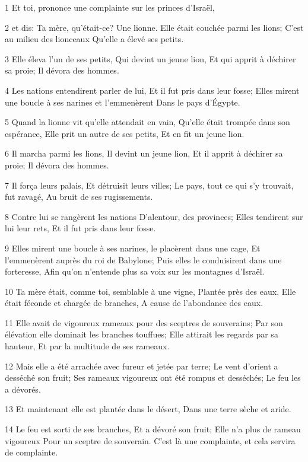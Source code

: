 \par 1 Et toi, prononce une complainte sur les princes d'Israël,
\par 2 et dis: Ta mère, qu'était-ce? Une lionne. Elle était couchée parmi les lions; C'est au milieu des lionceaux Qu'elle a élevé ses petits.
\par 3 Elle éleva l'un de ses petits, Qui devint un jeune lion, Et qui apprit à déchirer sa proie; Il dévora des hommes.
\par 4 Les nations entendirent parler de lui, Et il fut pris dans leur fosse; Elles mirent une boucle à ses narines et l'emmenèrent Dans le pays d'Égypte.
\par 5 Quand la lionne vit qu'elle attendait en vain, Qu'elle était trompée dans son espérance, Elle prit un autre de ses petits, Et en fit un jeune lion.
\par 6 Il marcha parmi les lions, Il devint un jeune lion, Et il apprit à déchirer sa proie; Il dévora des hommes.
\par 7 Il força leurs palais, Et détruisit leurs villes; Le pays, tout ce qui s'y trouvait, fut ravagé, Au bruit de ses rugissements.
\par 8 Contre lui se rangèrent les nations D'alentour, des provinces; Elles tendirent sur lui leur rets, Et il fut pris dans leur fosse.
\par 9 Elles mirent une boucle à ses narines, le placèrent dans une cage, Et l'emmenèrent auprès du roi de Babylone; Puis elles le conduisirent dans une forteresse, Afin qu'on n'entende plus sa voix sur les montagnes d'Israël.
\par 10 Ta mère était, comme toi, semblable à une vigne, Plantée près des eaux. Elle était féconde et chargée de branches, A cause de l'abondance des eaux.
\par 11 Elle avait de vigoureux rameaux pour des sceptres de souverains; Par son élévation elle dominait les branches touffues; Elle attirait les regards par sa hauteur, Et par la multitude de ses rameaux.
\par 12 Mais elle a été arrachée avec fureur et jetée par terre; Le vent d'orient a desséché son fruit; Ses rameaux vigoureux ont été rompus et desséchés; Le feu les a dévorés.
\par 13 Et maintenant elle est plantée dans le désert, Dans une terre sèche et aride.
\par 14 Le feu est sorti de ses branches, Et a dévoré son fruit; Elle n'a plus de rameau vigoureux Pour un sceptre de souverain. C'est là une complainte, et cela servira de complainte.

